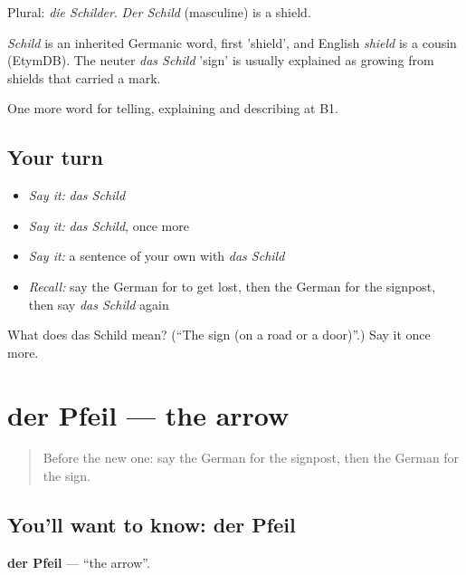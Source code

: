 Plural: \emph{die Schilder}. \emph{Der Schild} (masculine) is a shield.

\begin{cousinweb}
\emph{Schild} is an inherited Germanic word, first 'shield', and English \emph{shield} is a cousin (EtymDB). The neuter \emph{das Schild} 'sign' is usually explained as growing from shields that carried a mark.
\end{cousinweb}

\begin{grammarlens}[title={What you've built}]
One more word for telling, explaining and describing at B1.
\end{grammarlens}

\subsection*{Your turn}
\begin{itemize}
\raggedright
  \item \emph{Say it:} \emph{das Schild}
  \item \emph{Say it:} \emph{das Schild}, once more
  \item \emph{Say it:} a sentence of your own with \emph{das Schild}
  \item \emph{Recall:} say the German for to get lost, then the German for the signpost, then say \emph{das Schild} again
\end{itemize}

\begin{tcolorbox}[breakable,colback=teal!4,colframe=teal!35!black,title={Before you move on}]
What does das Schild mean? (\textquotedblleft{}The sign (on a road or a door)\textquotedblright{}.) Say it once more.
\end{tcolorbox}
\section[der Pfeil]{der Pfeil — the arrow}

\label{lesson:GE-C434-pfeil}



\begin{quote}
Before the new one: say the German for the signpost, then the German for the sign.
\end{quote}

\subsection*{You'll want to know: der Pfeil}
\textbf{der Pfeil} — \textquotedblleft{}the arrow\textquotedblright{}.

